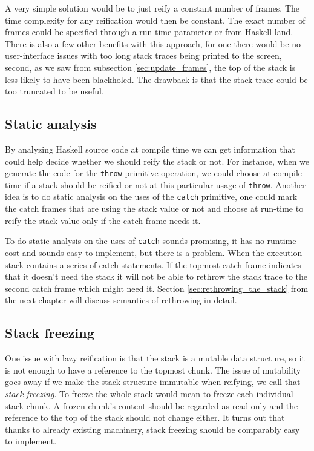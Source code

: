 A very simple solution would be to just reify a constant number of
frames. The time complexity for any reification would then be constant.
The exact number of frames could be specified through a run-time parameter
or from Haskell-land. There is also a few other benefits with this
approach, for one there would be no user-interface issues with too
long stack traces being printed to the screen, second, as we saw from subsection
\ref{sec:update_frames}, the top of the stack is less likely to have
been blackholed. The drawback is that the stack trace could
be too truncated to be useful.

\subsection{Static analysis} \label{reify_static_analysis}

By analyzing Haskell source code at compile time we can get
information that could help decide whether we should reify the stack or
not. For instance, when we generate the code for the \texttt{throw}
primitive operation, we could choose at compile time if a stack should be reified or
not at this particular usage of \texttt{throw}. Another idea is to do
static analysis on the uses of the \texttt{catch} primitive, one could mark
the catch frames that are using the stack value or not and choose at
run-time to reify the stack value only if the catch frame needs it.

To do static analysis on the uses of \texttt{catch} sounds promising, it has no runtime cost
and sounds easy to implement, but there is a problem. When the execution
stack contains a series of catch statements. If the topmost catch frame
indicates that it doesn't need the stack it will not be able to rethrow
the stack trace to the second catch frame which might need it. Section
\ref{sec:rethrowing_the_stack} from the next chapter will discuss semantics of rethrowing in
detail.

\subsection{Stack freezing} \label{sec:stack_freezing}

One issue with lazy reification is that the stack is a mutable data
structure, so it is not enough to have a reference to the
topmost chunk. The issue of mutability goes away if we make the stack structure
immutable when reifying, we call that \emph{stack freezing}. To freeze the whole stack
would mean to freeze each individual stack chunk. A frozen chunk's
content should be regarded as read-only and the reference to the top
of the stack should not change either. It turns out that thanks to
already existing machinery, stack freezing should be comparably easy to
implement.

